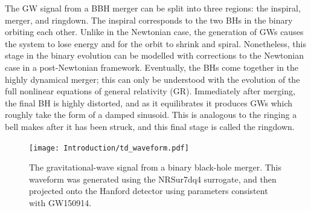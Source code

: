 The GW signal from a BBH merger can be split into three regions: the inspiral, merger, and ringdown.
The inspiral corresponds to the two BHs in the binary orbiting each other. 
Unlike in the Newtonian case, the generation of GWs causes the system to lose energy and for the orbit to shrink and spiral. 
Nonetheless, this stage in the binary evolution can be modelled with corrections to the Newtonian case in a post-Newtonian framework. 
Eventually, the BHs come together in the highly dynamical merger; this can only be understood with the evolution of the full nonlinear equations of general relativity (GR). 
Immediately after merging, the final BH is highly distorted, and as it equilibrates it produces GWs which roughly take the form of a damped sinusoid. 
This is analogous to the ringing a bell makes after it has been struck, and this final stage is called the ringdown.

\begin{figure}[t]
	\centering
	\texttt{[image: Introduction/td\_waveform.pdf]}
	\caption[The time-domain gravitational-wave signal from a binary black-hole merger.]{ 
		The gravitational-wave signal from a binary black-hole merger. This waveform was generated using the NRSur7dq4 surrogate, and then projected onto the Hanford detector using parameters consistent with GW150914.}
	\label{fig:ch1:td_waveform}
\end{figure}

